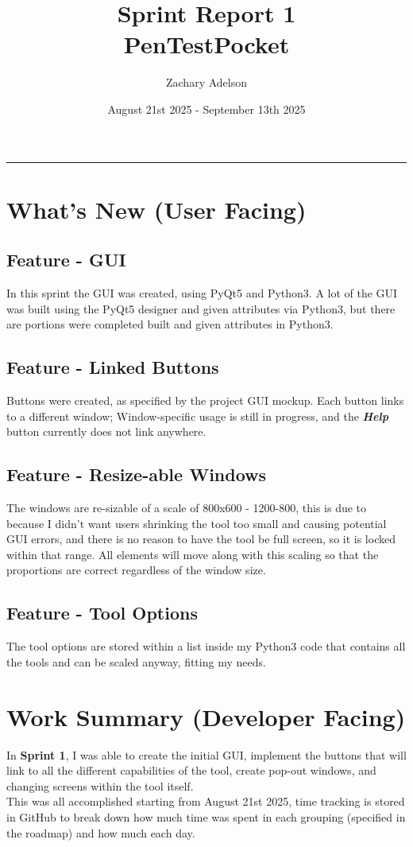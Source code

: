 \documentclass{article}
\title{Sprint Report 1\\\small{PenTestPocket}}
\author{Zachary Adelson}
\date{August 21st 2025 - September 13th 2025}
\begin{document}
\maketitle
\rule{10cm}{0.25pt}
\centering

\section{What's New (User Facing)}
\subsection{Feature - GUI} In this sprint the GUI was created, using PyQt5 and Python3. A lot of the GUI was built using the PyQt5 designer and given attributes via Python3, but there are portions were completed built and given attributes in Python3.
\subsection{Feature - Linked Buttons} Buttons were created, as specified by the project GUI mockup. Each button links to a different window; Window-specific usage is still in progress, and the \textbf{\textit{Help}} button currently does not link anywhere.
\subsection{Feature - Resize-able Windows} The windows are re-sizable of a scale of 800x600 - 1200-800, this is due to because I didn't want users shrinking the tool too small and causing potential GUI errors, and there is no reason to have the tool be full screen, so it is locked within that range. All elements will move along with this scaling so that the proportions are correct regardless of the window size.
\subsection{Feature - Tool Options} The tool options are stored within a list inside my Python3 code that contains all the tools and can be scaled anyway, fitting my needs.
\newpage
\section{Work Summary (Developer Facing)}
\large{
In \textbf{Sprint 1}, I was able to create the initial GUI, implement the buttons that will link to all the different capabilities of the tool, create pop-out windows, and changing screens within the tool itself.\\ This was all accomplished starting from August 21st 2025, time tracking is stored in GitHub to break down how much time was spent in each grouping (specified in the roadmap) and how much each day.
}
\newpage
\end{document}
